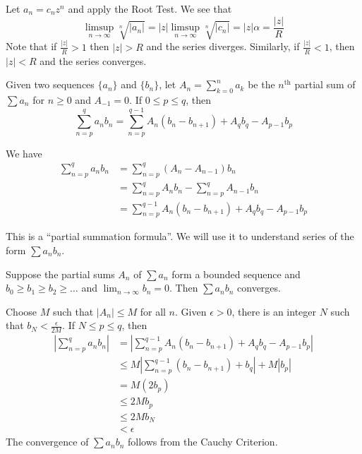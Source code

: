 \documentclass{mathnotes}
\begin{document}
\begin{pf}
  Let $a_n=c_nz^n$ and apply the Root Test. We see that
  $$\limsup_{n\to\infty}\sqrt[n]{|a_n|}=|z|
  \limsup_{n\to\infty}\sqrt[n]{|c_n|}=|z|\alpha=\frac{|z|}{R}$$
  Note that if $\frac{|z|}{R}>1$ then $|z|>R$ and the series diverges.
  Similarly, if $\frac{|z|}{R}<1$, then $|z|<R$ and the series converges.
\end{pf}

\begin{prop}
  Given two sequences $\{a_n\}$ and $\{b_n\}$, let $A_n=\sum_{k=0}^na_k$ be the
  $n^{\text{th}}$ partial sum of $\sum a_n$ for $n\ge0$ and $A_{-1}=0$. If
  $0\le p\le q$, then
  $$\sum_{n=p}^qa_nb_n=\sum_{n=p}^{q-1}A_n(b_n-b_{n+1})+A_qb_q-A_{p-1}b_p$$
\end{prop}

\begin{pf}
  We have
  \begin{align*}
    \sum_{n=p}^qa_nb_n&=\sum_{n=p}^q(A_n-A_{n-1})b_n\\
                      &=\sum_{n=p}^qA_nb_n-\sum_{n=p}^qA_{n-1}b_n\\
                      &=\sum_{n=p}^{q-1}A_n(b_n-b_{n+1})+A_qb_q-A_{p-1}b_p
  \end{align*}
\end{pf}

\begin{note}
  This is a ``partial summation formula''. We will use it to understand series
  of the form $\sum a_nb_n$.
\end{note}

\begin{prop}
  Suppose the partial sums $A_n$ of $\sum a_n$ form a bounded sequence and
  $b_0\ge b_1\ge b_2\ge\ldots$ and $\lim_{n\to\infty}b_n=0$. Then $\sum a_nb_n$
  converges.
\end{prop}

\begin{pf}
  Choose $M$ such that $|A_n|\le M$ for all $n$. Given $\epsilon>0$, there is
  an integer $N$ such that $b_N<\frac{\epsilon}{2M}$. If $N\le p\le q$, then
  \begin{align*}
    \left|\sum_{n=p}^qa_nb_n\right|
    &=\left|\sum_{n=p}^{q-1}A_n(b_n-b_{n+1})+A_qb_q-A_{p-1}b_p\right|\\
    &\le M\left|\sum_{n=p}^{q-1}(b_n-b_{n+1})+b_q\right|+M\left|b_p\right|\\
    &=M(2b_p)\\
    &\le2Mb_p\\
    &\le2Mb_N\\
    &<\epsilon
  \end{align*}
  The convergence of $\sum a_nb_n$ follows from the Cauchy Criterion.
\end{pf}
\end{document}
